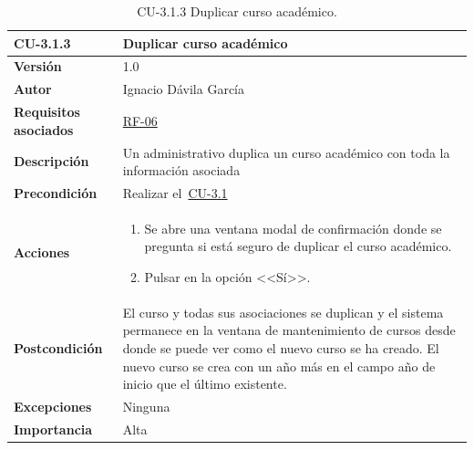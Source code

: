 \begin{table}[p]
\label{table:CU-3.1.3}
	\centering
	\begin{tabularx}{\linewidth}{ p{} p{} }
		\toprule
		\textbf{CU-3.1.3}    & \textbf{Duplicar curso académico}\\
		\toprule
		\textbf{Versión}              & 1.0    \\
		\textbf{Autor}                & Ignacio Dávila García \\
		\textbf{Requisitos asociados} & \hyperref[itm:RF6]{RF-06} \\
		\textbf{Descripción}          & Un administrativo duplica un curso académico con toda la información asociada \\
		\textbf{Precondición}         & Realizar el~\hyperref[table:CU-3.1]{CU-3.1} \\
		\textbf{Acciones}             &
		\begin{enumerate}
			\def\labelenumi{\arabic{enumi}.}
			\tightlist
			\item Se abre una ventana modal de confirmación donde se pregunta si está seguro de duplicar el curso académico.
			\item Pulsar en la opción <<Sí>>.
		\end{enumerate}\\
		\textbf{Postcondición}        & El curso y todas sus asociaciones se duplican y el sistema permanece en la ventana de mantenimiento de cursos desde donde se puede ver como el nuevo curso se ha creado. El nuevo curso se crea con un año más en el campo año de inicio que el último existente. \\
		\textbf{Excepciones}          & Ninguna \\
		\textbf{Importancia}          & Alta \\
		\bottomrule
	\end{tabularx}
	\caption{CU-3.1.3 Duplicar curso académico.}
\end{table}
\FloatBarrier

